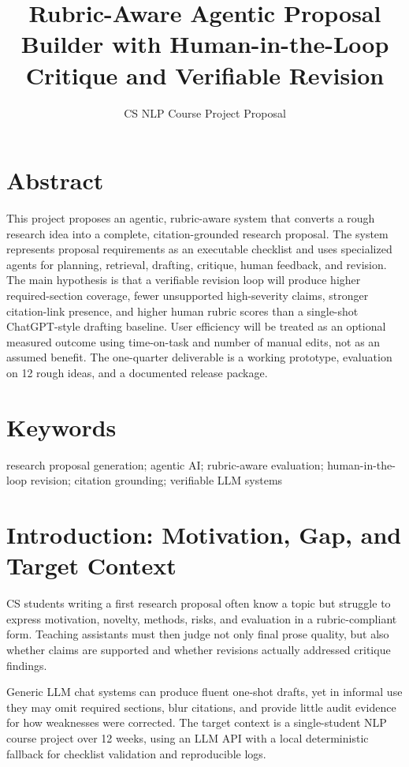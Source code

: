 \documentclass[11pt]{article}
\title{Rubric-Aware Agentic Proposal Builder with Human-in-the-Loop Critique and Verifiable Revision}
\author{CS NLP Course Project Proposal}
\date{}
\begin{document}
\maketitle
\vspace{-1.4em}

\section*{Abstract}
This project proposes an agentic, rubric-aware system that converts a rough research idea into a complete, citation-grounded research proposal. The system represents proposal requirements as an executable checklist and uses specialized agents for planning, retrieval, drafting, critique, human feedback, and revision. The main hypothesis is that a verifiable revision loop will produce higher required-section coverage, fewer unsupported high-severity claims, stronger citation-link presence, and higher human rubric scores than a single-shot ChatGPT-style drafting baseline. User efficiency will be treated as an optional measured outcome using time-on-task and number of manual edits, not as an assumed benefit. The one-quarter deliverable is a working prototype, evaluation on 12 rough ideas, and a documented release package.

\section*{Keywords}
research proposal generation; agentic AI; rubric-aware evaluation; human-in-the-loop revision; citation grounding; verifiable LLM systems

\section*{Introduction: Motivation, Gap, and Target Context}
CS students writing a first research proposal often know a topic but struggle to express motivation, novelty, methods, risks, and evaluation in a rubric-compliant form. Teaching assistants must then judge not only final prose quality, but also whether claims are supported and whether revisions actually addressed critique findings.

Generic LLM chat systems can produce fluent one-shot drafts, yet in informal use they may omit required sections, blur citations, and provide little audit evidence for how weaknesses were corrected. The target context is a single-student NLP course project over 12 weeks, using an LLM API with a local deterministic fallback for checklist validation and reproducible logs.
\end{document}

